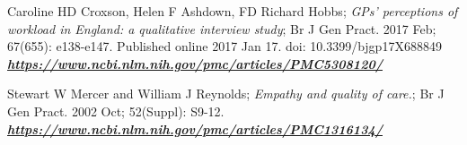 \documentclass[12pt,a4paper,oneside]{article}
\begin{document}
\begin{thebibliography}{11}
Caroline HD Croxson, Helen F Ashdown, FD Richard Hobbs; \emph{GPs' perceptions of workload in England: a qualitative interview study}; Br J Gen Pract. 2017 Feb; 67(655): e138-e147.
Published online 2017 Jan 17. doi:  10.3399/bjgp17X688849\\\textbf{\emph{\href{https://www.ncbi.nlm.nih.gov/pmc/articles/PMC5308120/
}{\url{https://www.ncbi.nlm.nih.gov/pmc/articles/PMC5308120/}}}}

Stewart W Mercer and William J Reynolds; \emph{Empathy and quality of care.}; Br J Gen Pract. 2002 Oct; 52(Suppl): S9-12. \\\textbf{\emph{\href{https://www.ncbi.nlm.nih.gov/pmc/articles/PMC1316134/
}{\url{https://www.ncbi.nlm.nih.gov/pmc/articles/PMC1316134/}}}}

\end{thebibliography} 
 
\end{document}
